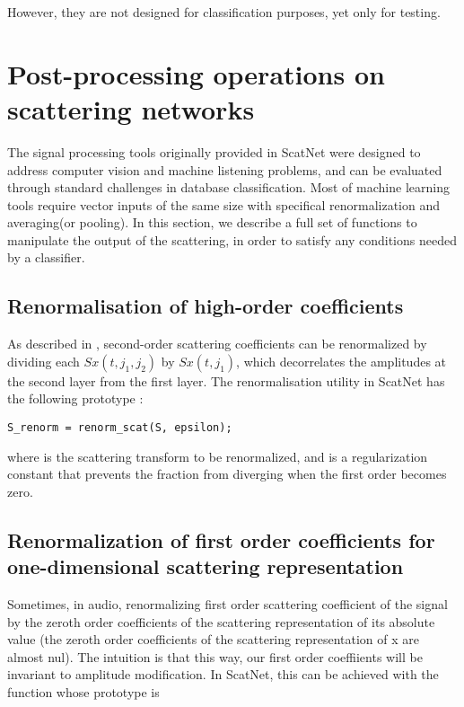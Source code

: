 \documentclass{article}
\begin{document}
However, they are not designed for classification purposes, yet only for testing.

\section{Post-processing operations on scattering networks \label{sec:utilities}}
The signal processing tools originally provided in ScatNet were designed to address computer vision and machine listening problems, and can be evaluated through standard challenges in database classification. Most of machine learning tools require vector inputs of the same size with specifical renormalization and averaging(or pooling). In this section, we describe a full set of functions to manipulate the output of the scattering, in order to satisfy any conditions needed by a classifier.

\subsection{Renormalisation of high-order coefficients}
As described in \cite{joakim}, second-order scattering coefficients can be renormalized by dividing each $Sx(t,j_1,j_2)$ by $Sx(t,j_1)$, which decorrelates the amplitudes at the second layer from the first layer. The renormalisation utility in ScatNet has the following prototype :

\begin{lstlisting}
S_renorm = renorm_scat(S, epsilon);
\end{lstlisting}

where  is the scattering transform to be renormalized, and  is a regularization constant that prevents the fraction from diverging when the first order becomes zero.

\subsection{Renormalization of first order coefficients for one-dimensional scattering representation}
Sometimes, in audio, renormalizing first order scattering coefficient of the signal by the zeroth order coefficients of the scattering representation of its absolute value (the zeroth order coefficients of the scattering representation of x are almost nul). The intuition is that this way, our first order coeffiients will be invariant to amplitude modification. 
In ScatNet, this can be achieved with the function  whose prototype is 
\end{document}
